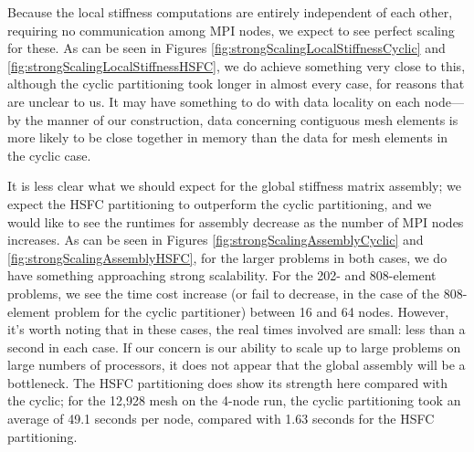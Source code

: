 Because the local stiffness computations are entirely independent of each other, requiring no communication among MPI nodes, we expect to see perfect scaling for these.  As can be seen in Figures \ref{fig:strongScalingLocalStiffnessCyclic} and \ref{fig:strongScalingLocalStiffnessHSFC}, we do achieve something very close to this, although the cyclic partitioning took longer in almost every case, for reasons that are unclear to us.  It may have something to do with data locality on each node---by the manner of our construction, data concerning contiguous mesh elements is more likely to be close together in memory than the data for mesh elements in the cyclic case.

It is less clear what we should expect for the global stiffness matrix assembly; we expect the HSFC partitioning to outperform the cyclic partitioning, and we would like to see the runtimes for assembly decrease as the number of MPI nodes increases.  As can be seen in Figures \ref{fig:strongScalingAssemblyCyclic} and \ref{fig:strongScalingAssemblyHSFC}, for the larger problems in both cases, we do have something approaching strong scalability.  For the 202- and 808-element problems, we see the time cost increase (or fail to decrease, in the case of the 808-element problem for the cyclic partitioner) between 16 and 64 nodes.  However, it's worth noting that in these cases, the real times involved are small: less than a second in each case.  If our concern is our ability to scale up to large problems on large numbers of processors, it does not appear that the global assembly will be a bottleneck.  The HSFC partitioning does show its strength here compared with the cyclic; for the 12,928 mesh on the 4-node run, the cyclic partitioning took an average of 49.1 seconds per node, compared with 1.63 seconds for the HSFC partitioning.

